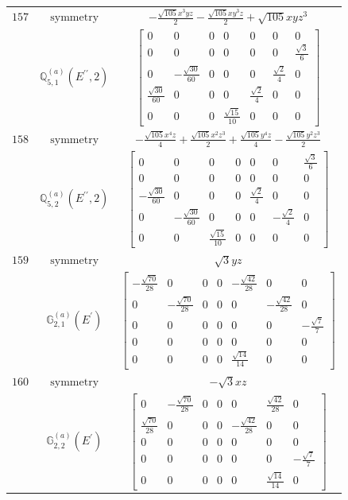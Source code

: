 \documentclass[fleqn,8pt,landscape]{jsarticle}
\begin{document}
\begin{longtable}{ccc}
$ 157 $ & $ \text{symmetry} $ & $ - \frac{\sqrt{105} x^{3} y z}{2} - \frac{\sqrt{105} x y^{3} z}{2} + \sqrt{105} x y z^{3} $ \\
$  $ & $ \mathbb{Q}_{5,1}^{(a)}(E^{\prime\prime},2) $ & $ \begin{bmatrix} 0 & 0 & 0 & 0 & 0 & 0 & 0 \\ 0 & 0 & 0 & 0 & 0 & 0 & \frac{\sqrt{3}}{6} \\ 0 & - \frac{\sqrt{30}}{60} & 0 & 0 & 0 & \frac{\sqrt{2}}{4} & 0 \\ \frac{\sqrt{30}}{60} & 0 & 0 & 0 & \frac{\sqrt{2}}{4} & 0 & 0 \\ 0 & 0 & 0 & \frac{\sqrt{15}}{10} & 0 & 0 & 0 \end{bmatrix} $ \\ \hline
$ 158 $ & $ \text{symmetry} $ & $ - \frac{\sqrt{105} x^{4} z}{4} + \frac{\sqrt{105} x^{2} z^{3}}{2} + \frac{\sqrt{105} y^{4} z}{4} - \frac{\sqrt{105} y^{2} z^{3}}{2} $ \\
$  $ & $ \mathbb{Q}_{5,2}^{(a)}(E^{\prime\prime},2) $ & $ \begin{bmatrix} 0 & 0 & 0 & 0 & 0 & 0 & \frac{\sqrt{3}}{6} \\ 0 & 0 & 0 & 0 & 0 & 0 & 0 \\ - \frac{\sqrt{30}}{60} & 0 & 0 & 0 & \frac{\sqrt{2}}{4} & 0 & 0 \\ 0 & - \frac{\sqrt{30}}{60} & 0 & 0 & 0 & - \frac{\sqrt{2}}{4} & 0 \\ 0 & 0 & \frac{\sqrt{15}}{10} & 0 & 0 & 0 & 0 \end{bmatrix} $ \\ \hline
$ 159 $ & $ \text{symmetry} $ & $ \sqrt{3} y z $ \\
$  $ & $ \mathbb{G}_{2,1}^{(a)}(E^{\prime}) $ & $ \begin{bmatrix} - \frac{\sqrt{70}}{28} & 0 & 0 & 0 & - \frac{\sqrt{42}}{28} & 0 & 0 \\ 0 & - \frac{\sqrt{70}}{28} & 0 & 0 & 0 & - \frac{\sqrt{42}}{28} & 0 \\ 0 & 0 & 0 & 0 & 0 & 0 & - \frac{\sqrt{7}}{7} \\ 0 & 0 & 0 & 0 & 0 & 0 & 0 \\ 0 & 0 & 0 & 0 & \frac{\sqrt{14}}{14} & 0 & 0 \end{bmatrix} $ \\ \hline
$ 160 $ & $ \text{symmetry} $ & $ - \sqrt{3} x z $ \\
$  $ & $ \mathbb{G}_{2,2}^{(a)}(E^{\prime}) $ & $ \begin{bmatrix} 0 & - \frac{\sqrt{70}}{28} & 0 & 0 & 0 & \frac{\sqrt{42}}{28} & 0 \\ \frac{\sqrt{70}}{28} & 0 & 0 & 0 & - \frac{\sqrt{42}}{28} & 0 & 0 \\ 0 & 0 & 0 & 0 & 0 & 0 & 0 \\ 0 & 0 & 0 & 0 & 0 & 0 & - \frac{\sqrt{7}}{7} \\ 0 & 0 & 0 & 0 & 0 & \frac{\sqrt{14}}{14} & 0 \end{bmatrix} $ \\ \hline

\end{longtable}
\end{document}
